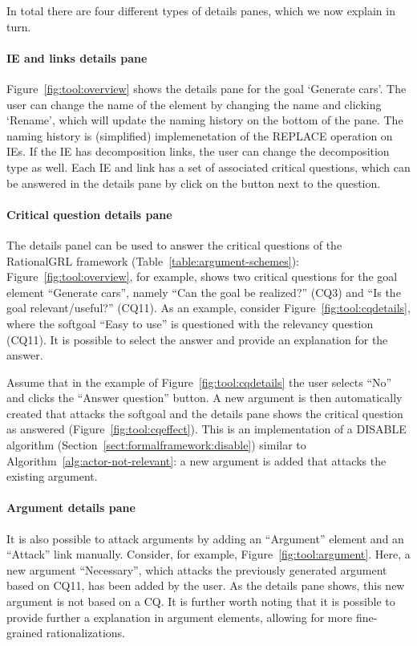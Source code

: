 In total there are four different types of details panes, which we now explain in turn.

\paragraph{IE and links details pane} Figure~\ref{fig:tool:overview} shows the details pane for the goal `Generate cars'. The user can change the name of the element by changing the name and clicking `Rename', which will update the naming history on the bottom of the pane. The naming history is (simplified) implemenetation of the \textsf{REPLACE} operation on IEs. If the IE has decomposition links, the user can change the decomposition type as well. Each IE and link has a set of associated critical questions, which can be answered in the details pane by click on the button next to the question.

\paragraph{Critical question details pane} The details panel can be used to answer the critical questions of the RationalGRL framework (Table~\ref{table:argument-schemes}): Figure~\ref{fig:tool:overview}, for example, shows two critical questions for the goal element ``Generate cars'', namely ``Can the goal be realized?'' (CQ3) and ``Is the goal relevant/useful?'' (CQ11). As an example, consider Figure~\ref{fig:tool:cqdetails}, where the softgoal ``Easy to use'' is questioned with the relevancy question (CQ11). It is possible to select the answer and provide an explanation for the answer. 

Assume that in the example of Figure~\ref{fig:tool:cqdetails} the user selects ``No'' and clicks the ``Answer question'' button. A new argument is then automatically created that attacks the softgoal and the details pane shows the critical question as answered (Figure~\ref{fig:tool:cqeffect}). This is an implementation of a \textsf{DISABLE} algorithm (Section~\ref{sect:formalframework:disable}) similar to Algorithm~\ref{alg:actor-not-relevant}: a new argument is added that attacks the existing argument. 

\paragraph{Argument details pane} It is also possible to attack arguments by adding an ``Argument'' element and an ``Attack'' link manually. Consider, for example, Figure~\ref{fig:tool:argument}. Here, a new argument ``Necessary'', which attacks the previously generated argument based on CQ11, has been added by the user. As the details pane shows, this new argument is not based on a CQ. It is further worth noting that it is possible to provide further a explanation in argument elements, allowing for more fine-grained rationalizations. 

